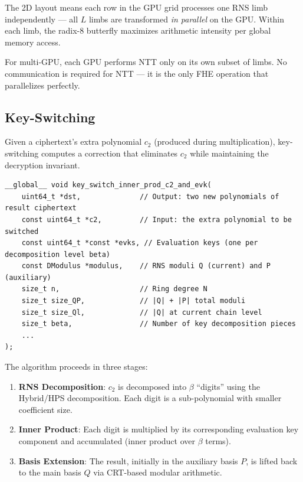 \documentclass[11pt,letterpaper]{article}
\begin{document}
The 2D layout means each row in the GPU grid processes one RNS limb independently --- all
$L$ limbs are transformed \emph{in parallel} on the GPU. Within each limb, the radix-8
butterfly maximizes arithmetic intensity per global memory access.

For multi-GPU, each GPU performs NTT only on its own subset of limbs. No communication is
required for NTT --- it is the only FHE operation that parallelizes perfectly.

\subsection{Key-Switching}

Given a ciphertext's extra polynomial $c_2$ (produced during multiplication), key-switching
computes a correction that eliminates $c_2$ while maintaining the decryption invariant.

\begin{lstlisting}[style=cpp, caption=Key-switching inner product kernel (evaluate.cuh)]
__global__ void key_switch_inner_prod_c2_and_evk(
    uint64_t *dst,              // Output: two new polynomials of result ciphertext
    const uint64_t *c2,         // Input: the extra polynomial to be switched
    const uint64_t *const *evks, // Evaluation keys (one per decomposition level beta)
    const DModulus *modulus,    // RNS moduli Q (current) and P (auxiliary)
    size_t n,                   // Ring degree N
    size_t size_QP,             // |Q| + |P| total moduli
    size_t size_Ql,             // |Q| at current chain level
    size_t beta,                // Number of key decomposition pieces
    ...
);
\end{lstlisting}

The algorithm proceeds in three stages:

\begin{enumerate}
  \item \textbf{RNS Decomposition}: $c_2$ is decomposed into $\beta$ ``digits'' using the
    Hybrid/HPS decomposition. Each digit is a sub-polynomial with smaller coefficient size.
  \item \textbf{Inner Product}: Each digit is multiplied by its corresponding evaluation key
    component and accumulated (inner product over $\beta$ terms).
  \item \textbf{Basis Extension}: The result, initially in the auxiliary basis $P$, is
    lifted back to the main basis $Q$ via CRT-based modular arithmetic.
\end{enumerate}
\end{document}
